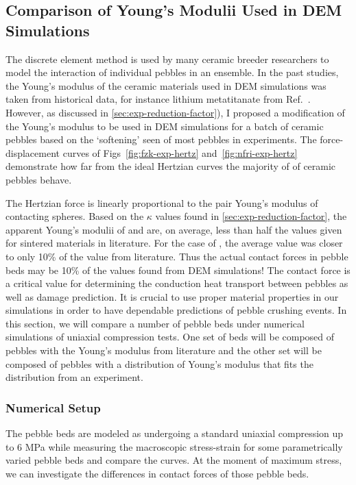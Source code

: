 \subsection{Comparison of Young's Modulii Used in DEM Simulations}\label{sec:dem-studies-youngs-modulus}

The discrete element method is used by many ceramic breeder researchers to model the interaction of individual pebbles in an ensemble.\cite{An20071393, Lu2000, Zhao2010, Gan:2010uq, Annabattula2012a, VanLew2014} In the past studies, the Young's modulus of the ceramic materials used in DEM simulations was taken from historical data, for instance lithium metatitanate from Ref.~\cite{Gierszewski1998}. However, as discussed in \cref{sec:exp-reduction-factor}), I proposed a modification of the Young's modulus to be used in DEM simulations for a batch of ceramic pebbles based on the `softening' seen of most pebbles in experiments. The force-displacement curves of Figs~\ref{fig:fzk-exp-hertz} and~\ref{fig:nfri-exp-hertz} demonstrate how far from the ideal Hertzian curves the majority of of ceramic pebbles behave.

The Hertzian force is linearly proportional to the pair Young's modulus of contacting spheres. Based on the $\kappa$ values found in \cref{sec:exp-reduction-factor}, the apparent Young's modulii of \lis and \lit are, on average, less than half the values given for sintered materials in literature. For the case of \lit, the average value was closer to only 10\% of the value from literature. Thus the actual contact forces in pebble beds may be 10\% of the values found from DEM simulations! The contact force is a critical value for determining the conduction heat transport between pebbles as well as damage prediction. It is crucial to use proper material properties in our simulations in order to have dependable predictions of pebble crushing events. In this section, we will compare a number of pebble beds under numerical simulations of uniaxial compression tests. One set of beds will be composed of pebbles with the Young's modulus from literature and the other set will be composed of pebbles with a distribution of Young's modulus that fits the distribution from an experiment.



\subsubsection{Numerical Setup}
The pebble beds are modeled as undergoing a standard uniaxial compression up to 6 MPa while measuring the macroscopic stress-strain for some parametrically varied pebble beds and compare the curves. At the moment of maximum stress, we can investigate the differences in contact forces of those pebble beds.

